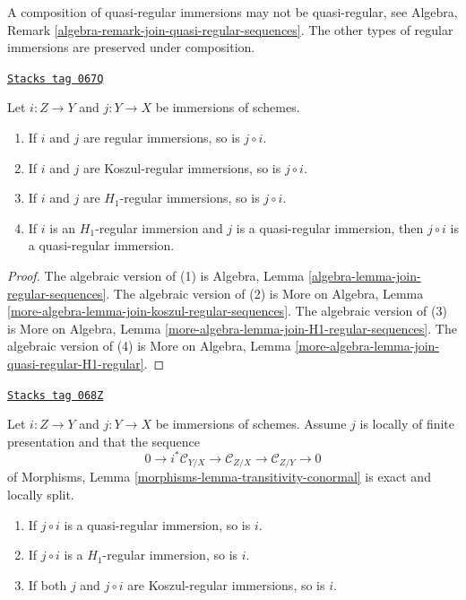 A composition of quasi-regular immersions may not be quasi-regular, see
Algebra, Remark \ref{algebra-remark-join-quasi-regular-sequences}.
The other types of regular immersions are preserved under composition.

\begin{lemma}
\label{divisors-lemma-composition-regular-immersion}
\href{https://stacks.math.columbia.edu/tag/067Q}{\texttt{Stacks tag 067Q}}

Let $i : Z \to Y$ and $j : Y \to X$ be immersions of schemes.
\begin{enumerate}
\item If $i$ and $j$ are regular immersions, so is $j \circ i$.
\item If $i$ and $j$ are Koszul-regular immersions, so is $j \circ i$.
\item If $i$ and $j$ are $H_1$-regular immersions, so is $j \circ i$.
\item If $i$ is an $H_1$-regular immersion and $j$ is a quasi-regular
immersion, then $j \circ i$ is a quasi-regular immersion.
\end{enumerate}
\end{lemma}

\begin{proof}
The algebraic version of (1) is
Algebra, Lemma \ref{algebra-lemma-join-regular-sequences}.
The algebraic version of (2) is
More on Algebra, Lemma \ref{more-algebra-lemma-join-koszul-regular-sequences}.
The algebraic version of (3) is
More on Algebra, Lemma \ref{more-algebra-lemma-join-H1-regular-sequences}.
The algebraic version of (4) is
More on Algebra, Lemma \ref{more-algebra-lemma-join-quasi-regular-H1-regular}.
\end{proof}

\begin{lemma}
\label{divisors-lemma-permanence-regular-immersion}
\href{https://stacks.math.columbia.edu/tag/068Z}{\texttt{Stacks tag 068Z}}

Let $i : Z \to Y$ and $j : Y \to X$ be immersions of schemes. Assume
$j$ is locally of finite presentation and that the sequence
$$
0 \to i^*\mathcal{C}_{Y/X} \to
\mathcal{C}_{Z/X} \to
\mathcal{C}_{Z/Y} \to 0
$$
of
Morphisms, Lemma \ref{morphisms-lemma-transitivity-conormal}
is exact and locally split.
\begin{enumerate}
\item If $j \circ i$ is a quasi-regular immersion, so is $i$.
\item If $j \circ i$ is a $H_1$-regular immersion, so is $i$.
\item If both $j$ and $j \circ i$ are Koszul-regular immersions, so is $i$.
\end{enumerate}
\end{lemma}


